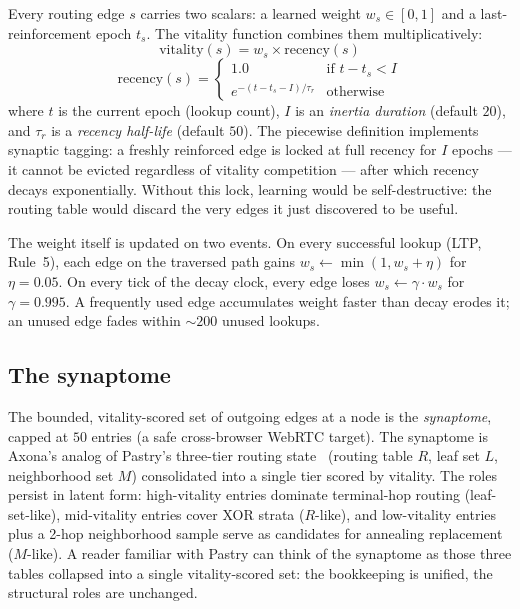 \documentclass[conference]{IEEEtran}
\newcommand{\axona}{Axona\xspace}
\begin{document}
Every routing edge $s$ carries two scalars: a learned weight
$w_s \in [0,1]$ and a last-reinforcement epoch $t_s$.  The
vitality function combines them multiplicatively:
\begin{equation}
\mathrm{vitality}(s) = w_s \times \mathrm{recency}(s)
\label{eq:vitality}
\end{equation}
\begin{equation}
\mathrm{recency}(s) =
\begin{cases}
1.0 & \text{if } t - t_s < I \\
e^{-(t - t_s - I)/\tau_r} & \text{otherwise}
\end{cases}
\label{eq:recency}
\end{equation}
where $t$ is the current epoch (lookup count), $I$ is an
\emph{inertia duration} (default $20$), and $\tau_r$ is a
\emph{recency half-life} (default $50$).  The piecewise
definition implements synaptic tagging: a freshly reinforced
edge is locked at full recency for $I$ epochs --- it cannot be
evicted regardless of vitality competition --- after which
recency decays exponentially.  Without this lock, learning
would be self-destructive: the routing table would discard the
very edges it just discovered to be useful.

The weight itself is updated on two events.  On every successful
lookup (LTP, Rule~5), each edge on the traversed path gains
$w_s \leftarrow \min(1, w_s + \eta)$ for $\eta = 0.05$.  On every
tick of the decay clock, every edge loses
$w_s \leftarrow \gamma \cdot w_s$ for $\gamma = 0.995$.  A
frequently used edge accumulates weight faster than decay erodes
it; an unused edge fades within $\sim\!200$ unused lookups.

\subsection{The synaptome}
\label{sec:axona-synaptome}

The bounded, vitality-scored set of outgoing edges at a node is
the \emph{synaptome}, capped at $50$ entries (a safe
cross-browser WebRTC target).  The synaptome is \axona's analog
of Pastry's three-tier routing
state~\cite{rowstron2001pastry} (routing table $R$, leaf set
$L$, neighborhood set $M$) consolidated into a single tier
scored by vitality.  The roles persist in latent form:
high-vitality entries dominate terminal-hop routing
(leaf-set-like), mid-vitality entries cover XOR strata
($R$-like), and low-vitality entries plus a 2-hop neighborhood
sample serve as candidates for annealing replacement
($M$-like).  A reader familiar with Pastry can think of the
synaptome as those three tables collapsed into a single
vitality-scored set: the bookkeeping is unified, the structural
roles are unchanged.
\end{document}
